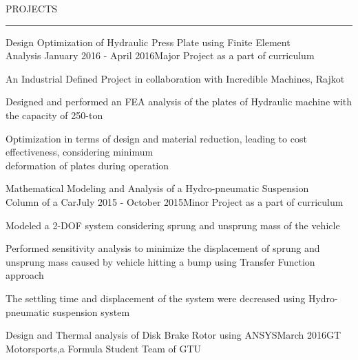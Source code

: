 \documentclass{resume} %
\renewenvironment{rSection}[1]{
\sectionskip
\textcolor{TsinghuaPurple}{\MakeUppercase{#1}}
\sectionlineskip
\hrule
\begin{list}{}{
\setlength{\leftmargin}{0em}
}
\item[]
}{
\end{list}
}
\begin{document}

\begin{rSection}{PROJECTS}

\begin{rSubsection}{Design Optimization of Hydraulic Press Plate using Finite Element
\\Analysis} {January 2016 - April 2016}{Major Project as a part of curriculum}{}

\item An Industrial Defined Project in collaboration with Incredible Machines, Rajkot
\item Designed and performed an FEA analysis of the plates of Hydraulic machine with the capacity of 250-ton    
\item Optimization in terms of design and material reduction, leading to cost effectiveness, considering minimum \\deformation of plates during operation 
 
\end{rSubsection}  


\begin{rSubsection}{Mathematical Modeling and Analysis of a Hydro-pneumatic Suspension
\\Column of a Car}{July 2015 - October 2015}{Minor Project as a part of curriculum}{} 
\item Modeled a 2-DOF system considering sprung and unsprung mass of the vehicle
\item Performed sensitivity analysis to minimize the displacement of sprung and unsprung mass caused by vehicle hitting a bump using Transfer Function approach  
\item The settling time and displacement of the system were decreased using Hydro-pneumatic suspension system   

\end{rSubsection}



\begin{rSubsection}{Design and Thermal analysis of Disk Brake Rotor using ANSYS}{March 2016}{GT Motorsports,a Formula Student Team of GTU}{}


\end{rSubsection}
\end{rSection}
\end{document}
